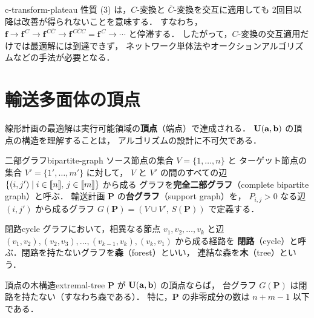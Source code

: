 \begin{remark}{}{c-transform-plateau}
  性質 (3) は，$C$-変換と $\bar{C}$-変換を交互に適用しても
  2回目以降は改善が得られないことを意味する．
  すなわち，$\mathbf{f} \to \mathbf{f}^{\,C} \to \mathbf{f}^{\,C\bar{C}}
  \to \mathbf{f}^{\,C\bar{C}C} = \mathbf{f}^{\,C} \to \cdots$
  と停滞する．
  したがって，$C$-変換の交互適用だけでは最適解には到達できず，
  ネットワーク単体法やオークションアルゴリズムなどの手法が必要となる．
\end{remark}

\section{輸送多面体の頂点}
\label{sec:vertices}

線形計画の最適解は実行可能領域の\textbf{頂点}（端点）で達成される．
$\mathbf{U}(\mathbf{a}, \mathbf{b})$ の頂点の構造を理解することは，
アルゴリズムの設計に不可欠である．

\begin{definition}{二部グラフ}{bipartite-graph}
  ソース節点の集合 $V = \{1, \ldots, n\}$ と
  ターゲット節点の集合 $V' = \{1', \ldots, m'\}$ に対して，
  $V$ と $V'$ の間のすべての辺 $\{(i, j') \mid i \in \llbracket n \rrbracket,\, j \in \llbracket m \rrbracket\}$ から成る
  グラフを\textbf{完全二部グラフ}（complete bipartite graph）と呼ぶ．
  輸送計画 $\mathbf{P}$ の\textbf{台グラフ}（support graph）を，
  $P_{i,j} > 0$ なる辺 $(i, j')$ から成るグラフ
  $G(\mathbf{P}) = (V \cup V',\, S(\mathbf{P}))$ で定義する．
\end{definition}

\begin{definition}{閉路}{cycle}
  グラフにおいて，相異なる節点 $v_1, v_2, \ldots, v_k$ と辺
  $(v_1, v_2), (v_2, v_3), \ldots, (v_{k-1}, v_k), (v_k, v_1)$ から成る経路を
  \textbf{閉路}（cycle）と呼ぶ．閉路を持たないグラフを\textbf{森}（forest）といい，
  連結な森を\textbf{木}（tree）という．
\end{definition}

\begin{proposition}{頂点の木構造}{extremal-tree}
  $\mathbf{P}$ が $\mathbf{U}(\mathbf{a}, \mathbf{b})$ の頂点ならば，
  台グラフ $G(\mathbf{P})$ は閉路を持たない（すなわち森である）．
  特に，$\mathbf{P}$ の非零成分の数は $n + m - 1$ 以下である．
\end{proposition}

